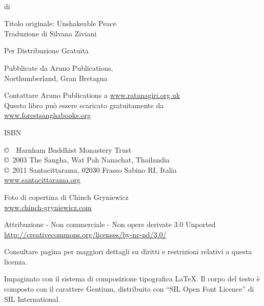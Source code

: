 {\small\setlength{\parskip}{0.8em}\setlength{\parindent}{0em}%
{\raggedright%

\thetitle\\
di \theauthor

Titolo originale: Unshakeable Peace\\
Traduzione di Silvana Ziviani

Per Distribuzione Gratuita

Pubblicate da Aruno Publications,\\
Northumberland, Gran Bretagna

Contattare Aruno Publications a \href{http://ratanagiri.org.uk}{www.ratanagiri.org.uk}\\
Questo libro può essere scaricato gratuitamente da\\
\href{http://forestsanghabooks.org/}{www.forestsanghabooks.org}

ISBN \theISBN

\copyright\ \the\year\ Harnham Buddhist Monastery Trust\\
\copyright\ 2003 The Sangha, Wat Pah Nanachat, Thailandia\\
\copyright\ 2011 Santacittarama, 02030 Frasso Sabino RI, Italia\\
\href{http://www.santacittarama.org/}{www.santacittarama.org}

Foto di copertina di Chinch Gryniewicz\\
\href{http://chinch-gryniewicz.com}{www.chinch-gryniewicz.com}

\vfill

{\footnotesize
Attribuzione - Non commerciale - Non opere derivate 3.0 Unported\\
\href{http://creativecommons.org/licenses/by-nc-nd/3.0/}{http://creativecommons.org/licenses/by-nc-nd/3.0/}

Consultare pagina \pageref{copyright-details} per maggiori dettagli su diritti e restrizioni relativi a questa licenza.

Impaginato con il sistema di composizione tipografica {\selectfont\LaTeX}. Il corpo del testo è composto con il carattere Gentium, distribuito con ``SIL Open Font Licence'' di SIL International.

\theEditionInfo\\
\thePrintedByInfo

}
}}

